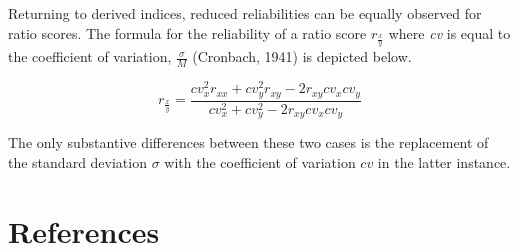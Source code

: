 \documentclass[
]{article}
\begin{document}
Returning to derived indices, reduced reliabilities can be equally observed for ratio scores. The formula for the reliability of a ratio score \(r_{\frac{x}{y}}\) where \emph{cv} is equal to the coefficient of variation, \({\frac{\sigma}{M}}\) (Cronbach, 1941) is depicted below.

\begin{equation}
r_{\frac{x}{y}} = \frac{cv_{x}^{2}r_{xx}+cv^{2}_{y}r_{xy}-2r_{xy}cv_{x}cv_{y}}{cv^{2}_{x}+cv^{2}_{y}-2r_{xy}cv_{x}cv_{y}}
\label{eq:rxx2}
\end{equation}

The only substantive differences between these two cases is the replacement of the standard deviation \(σ\) with the coefficient of variation \(cv\) in the latter instance.

\newpage

\section*{References}\label{references}
\end{document}
